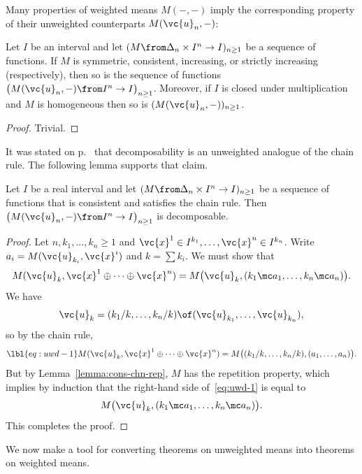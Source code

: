 Many properties of weighted means $M(-, -)$ imply the corresponding
property of their unweighted counterparts $M(\vc{u}_n, -)$:

\begin{lemma}
Let $I$ be an interval and let $(M \from \Delta_n \times I^n \to I)_{n
  \geq 1}$ be a sequence of functions.  If $M$ is symmetric, consistent,
increasing, or strictly increasing (respectively), then so is the sequence of
functions $\bigl(M(\vc{u}_n, -) \from I^n \to I\bigr)_{n \geq 1}$.
Moreover, if $I$ is closed under multiplication and $M$ is homogeneous then
so is $(M(\vc{u}_n, -))_{n \geq 1}$.  
\end{lemma}

\begin{proof}
Trivial.
\end{proof}

It was stated on p.~\pageref{p:decomp-analogue} that decomposability is
an unweighted analogue of the chain rule.  The following lemma supports
that claim.

\begin{lemma}
Let $I$ be a real interval and let $(M \from \Delta_n \times I^n \to I)_{n
  \geq 1}$ be a sequence of functions that is consistent and satisfies the
chain rule.  Then $\bigl( M(\vc{u}_n, -)\from I^n \to I\bigr)_{n \geq 1}$
is decomposable.
\end{lemma}

\begin{proof}
Let $n, k_1, \ldots, k_n \geq 1$ and $\vc{x}^1 \in I^{k_1}, \ldots,
\vc{x}^n \in I^{k_n}$.  Write $a_i = M(\vc{u}_{k_i}, \vc{x}^i)$ and $k =
\sum k_i$.  We must show that
\[
M(\vc{u}_k, \vc{x}^1 \oplus\cdots\oplus \vc{x}^n)
=
M\bigl(\vc{u}_k, (k_1 \mc a_1, \ldots, k_n \mc a_n)\bigr).
\]
We have
\[
\vc{u}_k
=
(k_1/k, \ldots, k_n/k) \of (\vc{u}_{k_1}, \ldots, \vc{u}_{k_n}),
\]
so by the chain rule,
% 
\begin{equation}
\lbl{eq:uwd-1}
M(\vc{u}_k, \vc{x}^1 \oplus\cdots\oplus \vc{x}^n)
=
M\bigl(
(k_1/k, \ldots, k_n/k), (a_1, \ldots, a_n)
\bigr).
\end{equation}
% 
But by Lemma~\ref{lemma:cons-chn-rep}, $M$ has the repetition property,
which implies by induction that the right-hand side of~\eqref{eq:uwd-1} is
equal to 
\[
M\bigl(\vc{u}_k, (k_1 \mc a_1, \ldots, k_n \mc a_n)\bigr).
\]
This completes the proof.
\end{proof}

We now make a tool for converting theorems on unweighted means into
theorems on weighted means.


